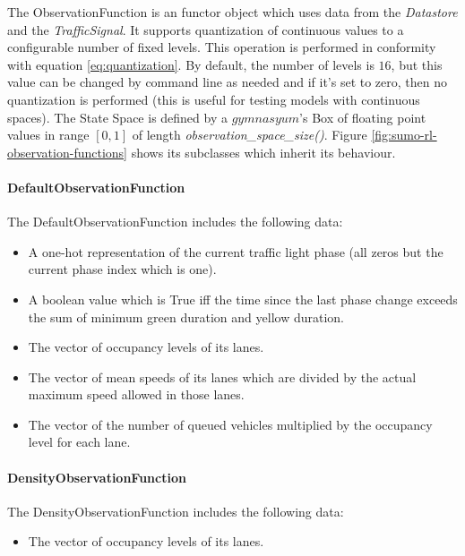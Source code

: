 The ObservationFunction is an functor object which uses data from the \textit{Datastore} and the \textit{TrafficSignal}. It supports quantization of continuous values to a configurable number of fixed levels. This operation is performed in conformity with equation \ref{eq:quantization}. By default, the number of levels is $16$, but this value can be changed by command line as needed and if it's set to zero, then no quantization is performed (this is useful for testing models with continuous spaces).
The State Space is defined by a $gymnasyum$'s Box of floating point values in range $[0, 1]$ of length \textit{observation\_space\_size()}.
Figure \ref{fig:sumo-rl-observation-functions} shows its subclasses which inherit its behaviour.


\paragraph{DefaultObservationFunction}

The DefaultObservationFunction includes the following data:
\begin{itemize}
  \item A one-hot representation of the current traffic light phase (all zeros but the current phase index which is one).
  \item A boolean value which is True iff the time since the last phase change exceeds the sum of minimum green duration and yellow duration.
  \item The vector of occupancy levels of its lanes.
  \item The vector of mean speeds of its lanes which are divided by the actual maximum speed allowed in those lanes.
  \item The vector of the number of queued vehicles multiplied by the occupancy level for each lane.
\end{itemize}

\paragraph{DensityObservationFunction}

The DensityObservationFunction includes the following data:
\begin{itemize}
  \item The vector of occupancy levels of its lanes.
\end{itemize}

